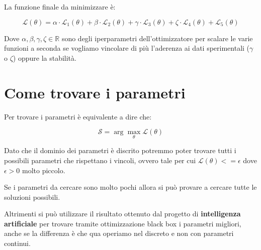 La funzione finale da minimizzare è:

\begin{equation}
    \mathcal{L}(\theta) = \alpha \cdot \mathcal{L}_1(\theta) + \beta \cdot \mathcal{L}_2(\theta) + \gamma \cdot \mathcal{L}_3(\theta) + \zeta \cdot \mathcal{L}_4(\theta) + \mathcal{L}_5(\theta)
\end{equation}

Dove $\alpha, \beta , \gamma, \zeta \in \mathbb{R}$ sono degli iperparametri dell'ottimizzatore per scalare
le varie funzioni a seconda se vogliamo vincolare di più l'aderenza ai dati sperimentali ($\gamma$ o $\zeta$) oppure la stabilità.

\section{Come trovare i parametri}

Per trovare i parametri è equivalente a dire che:

\begin{equation}
    \mathcal{S} = \arg\max_{\theta} \mathcal{L}(\theta)
\end{equation}

Dato che il dominio dei parametri è discrito potremmo poter trovare tutti i possibili parametri che rispettano i vincoli, ovvero tale per cui 
$\mathcal{L}(\theta) <= \epsilon$ dove $\epsilon > 0$ molto piccolo.

Se i parametri da cercare sono molto pochi allora si può provare a cercare tutte le soluzioni possibili.

Altrimenti si può utilizzare il risultato ottenuto dal progetto di \textbf{intelligenza artificiale} per trovare
tramite ottimizzazione black box i parametri migliori, anche se la differenza è che qua operiamo nel discreto e non con parametri continui.



